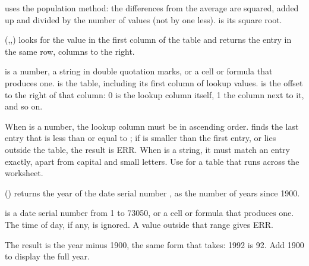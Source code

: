  uses the population method: the differences from the average are squared, added up and divided by the number of values (not by one less).  is its square root.

\Examples
{}

(,,) looks for the value  in the first column of the table  and returns the entry in the same row,  columns to the right.

 is a number, a string in double quotation marks, or a cell or formula that produces one.  is the table, including its first column of lookup values.  is the offset to the right of that column: 0 is the lookup column itself, 1 the column next to it, and so on.

When  is a number, the lookup column must be in ascending order.  finds the last entry that is less than or equal to ; if  is smaller than the first entry, or  lies outside the table, the result is ERR. When  is a string, it must match an entry exactly, apart from capital and small letters. Use  for a table that runs across the worksheet.

\Examples
{}

() returns the year of the date serial number , as the number of years since 1900.

 is a date serial number from 1 to 73050, or a cell or formula that produces one. The time of day, if any, is ignored. A value outside that range gives ERR.

The result is the year minus 1900, the same form that  takes: 1992 is 92. Add 1900 to display the full year.

\Examples
{}

